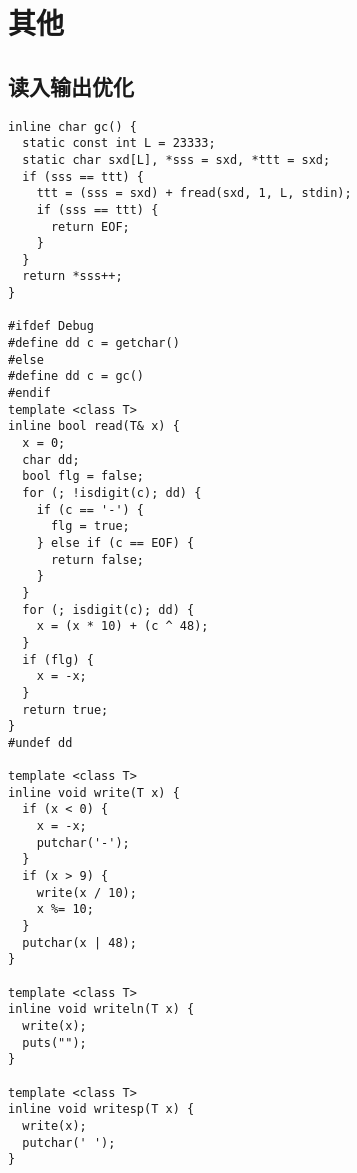 \documentclass[a4paper,11pt,twoside,fontset = fandol,UTF8]{ctexbook} %
\begin{document}
\chapter{其他}

\section{读入输出优化}
\begin{lstlisting}
inline char gc() {
  static const int L = 23333;
  static char sxd[L], *sss = sxd, *ttt = sxd;
  if (sss == ttt) {
    ttt = (sss = sxd) + fread(sxd, 1, L, stdin);
    if (sss == ttt) {
      return EOF;
    }
  }
  return *sss++;
}

#ifdef Debug
#define dd c = getchar()
#else
#define dd c = gc()
#endif
template <class T>
inline bool read(T& x) {
  x = 0;
  char dd;
  bool flg = false;
  for (; !isdigit(c); dd) {
    if (c == '-') {
      flg = true;
    } else if (c == EOF) {
      return false;
    }
  }
  for (; isdigit(c); dd) {
    x = (x * 10) + (c ^ 48);
  }
  if (flg) {
    x = -x;
  }
  return true;
}
#undef dd

template <class T>
inline void write(T x) {
  if (x < 0) {
    x = -x;
    putchar('-');
  }
  if (x > 9) {
    write(x / 10);
    x %= 10;
  }
  putchar(x | 48);
}

template <class T>
inline void writeln(T x) {
  write(x);
  puts("");
}

template <class T>
inline void writesp(T x) {
  write(x);
  putchar(' ');
}
\end{lstlisting}
  
\end{document}
